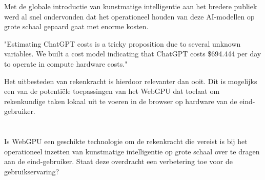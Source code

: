 Met de globale introductie van kunstmatige intelligentie aan het bredere publiek werd al snel ondervonden dat het operationeel houden van deze AI-modellen op grote schaal gepaard gaat met enorme kosten. \autocite{Patel2023}

\begin{displayquote}
    "Estimating ChatGPT costs is a tricky proposition due to several unknown variables. We built a cost model indicating that ChatGPT costs \$694.444 per day to operate in compute hardware costs."
\end{displayquote}

\bigbreak{}

Het uitbesteden van rekenkracht is hierdoor relevanter dan ooit. Dit is mogelijks een van de potentiële toepassingen van het WebGPU dat toelaat om rekenkundige taken lokaal uit te voeren in de browser op hardware van de eind-gebruiker.

\section{}%
\label{sec:onderzoeksvraag}


Is WebGPU een geschikte technologie om de rekenkracht die vereist is bij het operationeel inzetten van kunstmatige intelligentie op grote schaal over te dragen aan de eind-gebruiker. Staat deze overdracht een verbetering toe voor de gebruikservaring?


\section{}%
\label{sec:onderzoeksdoelstelling}


